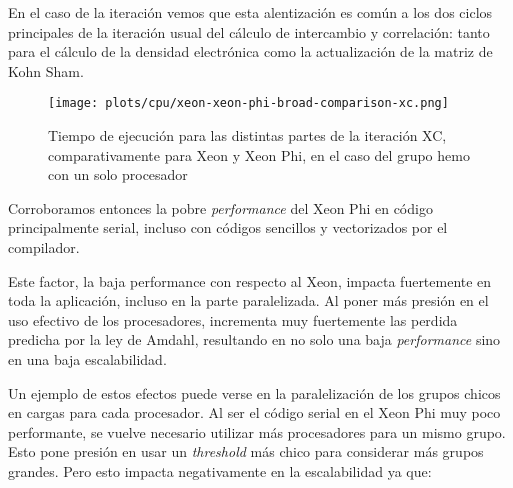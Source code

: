 En el caso de la iteraci\'on vemos que esta alentizaci\'on es com\'un a los dos
ciclos principales de la iteraci\'on usual del c\'alculo de intercambio y
correlaci\'on: tanto para el c\'alculo de la densidad electr\'onica como la
actualizaci\'on de la matriz de Kohn Sham.

\begin{figure}[htbp]
   \centering
   \texttt{[image: plots/cpu/xeon-xeon-phi-broad-comparison-xc.png]}
   \caption{Tiempo de ejecuci\'on para las distintas partes de la iteraci\'on XC,
   comparativamente para Xeon y Xeon Phi, en el caso del grupo hemo con un solo procesador}
   \label{fig:prelim-xeon-phi-xc}
\end{figure}

Corroboramos entonces la pobre \textit{performance} del Xeon Phi en c\'odigo
principalmente serial, incluso con c\'odigos sencillos y vectorizados por el
compilador.

Este factor, la baja performance con respecto al Xeon, impacta fuertemente en toda
la aplicaci\'on, incluso en la parte paralelizada. Al poner m\'as presi\'on en
el uso efectivo de los procesadores, incrementa muy fuertemente las perdida
predicha por la ley de Amdahl, resultando en no solo una baja \textit{performance}
sino en una baja escalabilidad.

Un ejemplo de estos efectos puede verse en la paralelizaci\'on de los grupos chicos
en cargas para cada procesador. Al ser el c\'odigo serial en el Xeon Phi muy poco
performante, se vuelve necesario utilizar m\'as procesadores para un mismo grupo.
Esto pone presi\'on en usar un \textit{threshold} m\'as chico para considerar
m\'as grupos grandes. Pero esto impacta negativamente en la escalabilidad ya que:

